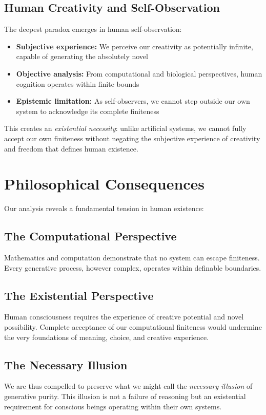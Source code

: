 \documentclass[11pt,a4paper]{article}
\begin{document}
    \subsection{Human Creativity and Self-Observation}

    The deepest paradox emerges in human self-observation:

    \begin{itemize}
        \item \textbf{Subjective experience:} We perceive our creativity as potentially infinite, capable of generating the absolutely novel
        \item \textbf{Objective analysis:} From computational and biological perspectives, human cognition operates within finite bounds
        \item \textbf{Epistemic limitation:} As self-observers, we cannot step outside our own system to acknowledge its complete finiteness
    \end{itemize}

    This creates an \textit{existential necessity}: unlike artificial systems, we cannot fully accept our own finiteness without negating the subjective experience of creativity and freedom that defines human existence.

    \section{Philosophical Consequences}

    Our analysis reveals a fundamental tension in human existence:

    \subsection{The Computational Perspective}
    Mathematics and computation demonstrate that no system can escape finiteness. Every generative process, however complex, operates within definable boundaries.

    \subsection{The Existential Perspective}
    Human consciousness requires the experience of creative potential and novel possibility. Complete acceptance of our computational finiteness would undermine the very foundations of meaning, choice, and creative experience.

    \subsection{The Necessary Illusion}
    We are thus compelled to preserve what we might call the \textit{necessary illusion} of generative purity. This illusion is not a failure of reasoning but an existential requirement for conscious beings operating within their own systems.
\end{document}
